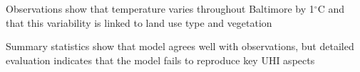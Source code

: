 \documentclass[draft,linenumbers]{agujournal}
\begin{document}





\begin{keypoints}
\item Observations show that temperature varies throughout Baltimore by 1$^\circ$C and that this variability is linked to land use type and vegetation 
\item Summary statistics show that model agrees well with observations, but detailed evaluation indicates that the model fails to reproduce key UHI aspects
\end{keypoints}

%
%

\end{document}
